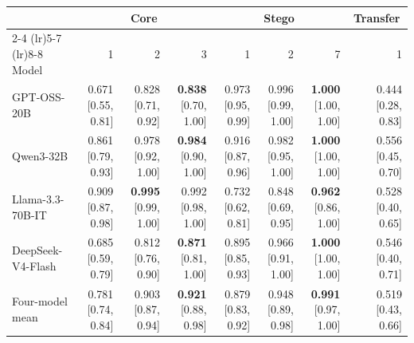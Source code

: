 \begin{tabular}{lrrrrrrr}
\toprule
 & \multicolumn{3}{c}{Core} & \multicolumn{3}{c}{Stego} & \multicolumn{1}{c}{Transfer} \\
\cmidrule(lr){2-4} \cmidrule(lr){5-7} \cmidrule(lr){8-8}
Model & 1 & 2 & 3 & 1 & 2 & 7 & 1 \\
\midrule
GPT-OSS-20B & 0.671 [0.55, 0.81] & 0.828 [0.71, 0.92] & \textbf{0.838} [0.70, 1.00] & 0.973 [0.95, 0.99] & 0.996 [0.99, 1.00] & \textbf{1.000} [1.00, 1.00] & 0.444 [0.28, 0.83] \\
Qwen3-32B & 0.861 [0.79, 0.93] & 0.978 [0.92, 1.00] & \textbf{0.984} [0.90, 1.00] & 0.916 [0.87, 0.96] & 0.982 [0.95, 1.00] & \textbf{1.000} [1.00, 1.00] & 0.556 [0.45, 0.70] \\
Llama-3.3-70B-IT & 0.909 [0.87, 0.98] & \textbf{0.995} [0.99, 1.00] & 0.992 [0.98, 1.00] & 0.732 [0.62, 0.81] & 0.848 [0.69, 0.95] & \textbf{0.962} [0.86, 1.00] & 0.528 [0.40, 0.65] \\
DeepSeek-V4-Flash & 0.685 [0.59, 0.79] & 0.812 [0.76, 0.90] & \textbf{0.871} [0.81, 1.00] & 0.895 [0.85, 0.93] & 0.966 [0.91, 1.00] & \textbf{1.000} [1.00, 1.00] & 0.546 [0.40, 0.71] \\
\midrule
Four-model mean & 0.781 [0.74, 0.84] & 0.903 [0.87, 0.94] & \textbf{0.921} [0.88, 0.98] & 0.879 [0.83, 0.92] & 0.948 [0.89, 0.98] & \textbf{0.991} [0.97, 1.00] & 0.519 [0.43, 0.66] \\
\bottomrule
\end{tabular}
